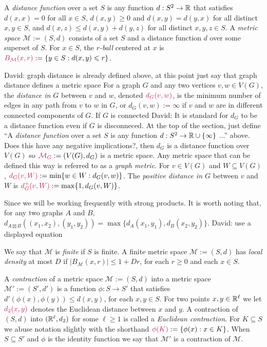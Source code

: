 \documentclass{patmorin}
\makeatletter
\renewcommand{\ge}{\geqslant}
\renewcommand{\le}{\leqslant}
\newcommand{\david}[1]{{\color{orange} David: #1}}
\newcommand{\defin}[1]{\emph{\textcolor{brightmaroon}{#1}}}
\def\mathcolor#1#{\@mathcolor{#1}}
\def\@mathcolor#1#2#3{%
  \protect\leavevmode
  \begingroup
    \color#1{#2}#3%
  \endgroup
}
\newcommand{\mathdefin}[1]{\mathcolor{brightmaroon}{#1}}
\makeatother
\begin{document}
A \defin{distance function} over a set $S$ is any function $d:S^2\to\mathbb{R}$ that satisfies $d(x,x)=0$ for all $x\in S$, $d(x,y)\ge 0$ and $d(x,y)=d(y,x)$ for all distinct $x,y\in S$, and $d(x,z) \le d(x,y)+d(y,z)$ for all distinct $x,y,z\in S$.  A \defin{metric space} $\mathcal{M}:=(S,d)$ consists of a set $S$ and a distance function $d$ over some superset of $S$.  For $x\in S$, the \defin{$r$-ball} centered at $x$ is $\mathdefin{B_{\mathcal{M}}(x,r)}:=\{y\in S:d(x,y)\le r\}$.

\david{graph distance is already defined above, at this point just say that graph distance defines a metric space} For a graph $G$ and any two vertices $v,w\in V(G)$, the \defin{distance in $G$} between $v$ and $w$, denoted $\mathdefin{d_G(v,w)}$, is the minimum number of edges in any path from $v$ to $w$ in $G$, or $d_G(v,w):=\infty$ if $v$ and $w$ are in different connected components of $G$.  If $G$ is connected \david{It is standard for $d_G$ to be a distance function even if $G$ is disconneced. At the top of the section, just define ``A \defin{distance function} over a set $S$ is any function $d:S^2\to\mathbb{R}\cup\{\infty\}$ ...'' above. Does this have any negative implications?}, then $d_G$ is a distance function over $V(G)$ so $\mathdefin{\mathcal{M}_G}:=(V(G),d_G)$ is a metric space. Any metric space that can be defined this way is referred to as a \defin{graph metric}.  For $v\in V(G)$ and $W\subseteq V(G)$, $\mathdefin{d_G(v,W)}:=\min\{w\in W:d_G(v,w)\}$. The \defin{positive distance in $G$} between $v$ and $W$ is $\mathdefin{d^+_G(v,W)}:=\max\{1,d_G(v,W)\}$.


Since we will be working frequently with strong products. It is worth noting that, for any two graphs $A$ and $B$, $d_{A\boxtimes B}((x_1,x_2),(y_1,y_2))=\max\{d_A(x_1,y_1),d_B(x_2,y_2)\}$.
\david{use a displayed equation}

We say that $\mathcal{M}$ is \defin{finite} if $S$ is finite.  A finite metric space $\mathcal{M}:=(S,d)$ has \defin{local density} at most $D$ if $|B_\mathcal{M}(x,r)|\le 1+Dr$, for each $r\ge 0$ and each $x\in S$.

A \defin{contraction} of a metric space $\mathcal{M}:=(S,d)$ into a metric space $\mathcal{M'}:=(S',d')$ is a function $\phi:S\to S'$ that satisfies $d'(\phi(x),\phi(y))\le d(x,y)$, for each $x,y\in S$.  For two points $x,y\in\mathbb{R}^\ell$ we let $\mathdefin{d_2(x,y)}$ denotes the Euclidean distance between $x$ and $y$.  A contraction of $(S,d)$ into $(\mathbb{R}^\ell, d_2)$ for some $\ell\ge 1$ is called a \defin{Euclidean contraction}.  For $K\subseteq S$ we abuse notation slightly with the shorthand $\mathdefin{\phi(K)}:=\{\phi(x):x\in K\}$.  When $S\subseteq S'$ and $\phi$ is the identity function we say that $\mathcal{M'}$ is a contraction of $\mathcal{M}$.
\end{document}
